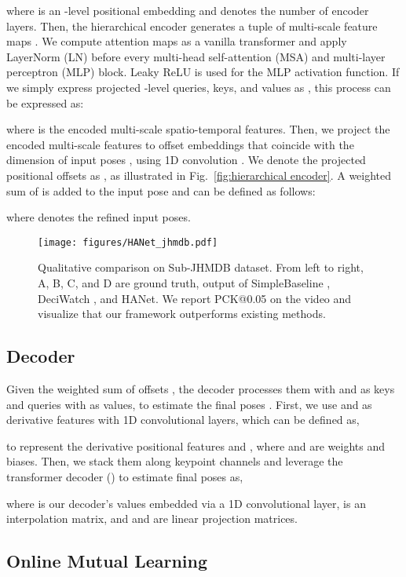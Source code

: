\documentclass[10pt,twocolumn,letterpaper]{article}
\begin{document}
where  is an -level positional embedding and  denotes the number of encoder layers. Then, the hierarchical encoder generates a tuple of multi-scale feature maps . We compute attention maps as a vanilla transformer \cite{attentionisallyouneed} and apply LayerNorm (LN) \cite{layernorm} before every multi-head self-attention (MSA) and multi-layer perceptron (MLP) block. Leaky ReLU \cite{lrelu} is used for the MLP activation function. If we simply express projected -level queries, keys, and values as , this process can be expressed as:

where  is the encoded multi-scale spatio-temporal features. Then, we project the encoded multi-scale features to offset embeddings that coincide with the dimension of input poses , using 1D convolution . We denote the projected positional offsets as , as illustrated in Fig.~\ref{fig:hierarchical encoder}. A weighted sum of  is added to the input pose  and can be defined as follows:

where  denotes the refined input poses.

\begin{figure*}[t]
\centering
\texttt{[image: figures/HANet\_jhmdb.pdf]}
\caption{Qualitative comparison on Sub-JHMDB \cite{jhmdb} dataset. From left to right, A, B, C, and D are ground truth, output of SimpleBaseline \cite{simplebaseline},  DeciWatch \cite{deciwatch}, and HANet. We report PCK@0.05 on the video and visualize that our framework outperforms existing methods. 
}
\label{fig:jhmdb qualitative}
\end{figure*}

\subsection{Decoder}
Given the weighted sum of offsets , the decoder processes them with  and  as keys and queries with  as values, to estimate the final poses . First, we use  and  as derivative features with 1D convolutional layers, which can be defined as,

to represent the derivative positional features  and , where  and  are weights and biases. Then, we stack them along keypoint channels and leverage the transformer decoder () to estimate final poses  as,

where  is our decoder's values embedded via a 1D convolutional layer,  is an interpolation matrix, and  and  are linear projection matrices.  

\subsection{Online Mutual Learning}
\end{document}
